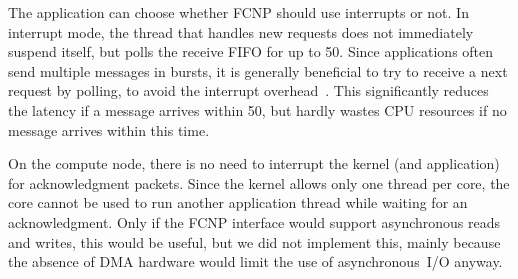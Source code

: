 \documentclass[journal]{IEEEtran}
\begin{document}
The application can choose whether FCNP should use interrupts or not.
In interrupt mode, the thread that handles new requests does not immediately
suspend itself, but polls the receive FIFO for up to 50\us.
Since applications often send multiple messages in bursts,
it is generally beneficial to try to receive a next request by polling,
to avoid the interrupt overhead~\cite{Langendoen:96}.
This significantly reduces the latency if a message arrives within 50\us,
but hardly wastes CPU resources if no message arrives within this time.

On the compute node, there is no need to interrupt the kernel (and application)
for acknowledgment packets.
Since the kernel allows only one thread per core, the core cannot be used to
run another application thread while waiting for an acknowledgment.
Only if the FCNP interface would support asynchronous reads and writes, this
would be useful, but we did not implement this, mainly because the absence of
DMA hardware would limit the use of asynchronous~I/O anyway.




%
%
\end{document}
